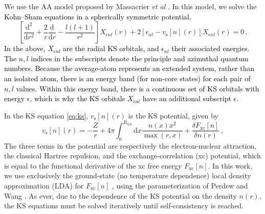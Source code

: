 \documentclass[%
 preprint,
 superscriptaddress,
 amsmath,amssymb,
longbibliography,
]{revtex4-2}
\newcommand{\RWS}{R_\textrm{VS}}
\newcommand{\change}[1]{\textcolor{black}{#1}}
\begin{document}
We use the AA model proposed by Massacrier \emph{et al} \cite{Massacrier_bands_2021}. In this model, we solve the \change{Kohn--Sham equations in a spherically symmetric potential},
\begin{equation} \label{eq:ks}
\left[\frac{\textrm{d}^2}{\textrm{d}r^2} + \frac{2}{r}\frac{\textrm{d}}{\textrm{d}r} - \frac{l(l+1)}{r^2} \right] X_{\epsilon nl}(r) + 2 \left[\epsilon_{nl} - v_\textrm{s}[n](r) \right] X_{\epsilon nl}(r) = 0\,.
\end{equation}
\change{In the above, $X_{\epsilon nl}$ are the radial KS orbitals, and $\epsilon_{nl}$ their associated energies. The $n,l$ indices in the subscripts denote the principle and azimuthal quantum numbers. Because the average-atom represents an extended system, rather than an isolated atom, there is an energy band (for non-core states) for each pair of $n,l$ values. Within this energy band, there is a continuous set of KS orbitals with energy $\epsilon$, which is why the KS orbitals $ X_{\epsilon nl}$ have an additional subscript $\epsilon$.
}

In the KS equation \eqref{eq:ks}, $v_\textrm{s}[n](r)$ is the KS potential, given by
\begin{equation}
 v_{\textrm{s}}[n](r) = -\frac{Z}{r} + 4\pi \int_0^{\RWS} \textrm{d}{x} \frac{n(x)x^2}{\max{(r,x)}} + \frac{\delta F_\textrm{xc} [n]}{\delta n(r)}\,,
\end{equation}
The three terms in the potential are
respectively the electron-nuclear attraction, the classical Hartree
repulsion, and the exchange-correlation (xc) potential, which is equal
to the functional derivative of the xc free energy $F_\textrm{xc}[n]$. In this work, we use exclusively the ground-state (no temperature dependence) local density approximation (LDA) for $F_\textrm{xc}[n]$ \cite{ks65}, using the parameterization of Perdew and Wang \cite{PW92}. As ever, due to the dependence of the KS potential on the density \(n(r)\), the KS equations
must be solved iteratively until self-consistency is reached.
\end{document}
